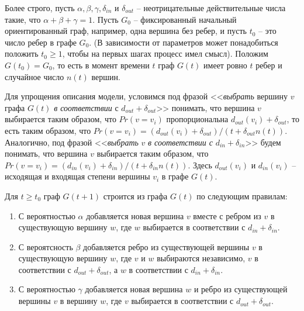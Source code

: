 \documentclass[14pt]{extreport}
\begin{document}
Более строго, пусть $\alpha, \beta, \gamma, \delta_{in}$ и $\delta_{out}$ -- неотрицательные действительные числа такие, что $\alpha + \beta + \gamma = 1$. Пусть $G_0$ -- фиксированный начальный ориентированный граф, например, одна вершина без ребер, и пусть $t_0$ -- это число ребер в графе $G_0$. (В зависимости от параметров может понадобиться положить $t_0 \ge 1$, чтобы на первых шагах процесс имел смысл). Положим $G(t_0) = G_0$, то есть в момент времени $t$ граф $G(t)$ имеет ровно $t$ ребер и случайное число $n(t)$ вершин.

Для упрощения описания модели, условимся под фразой <<{\it выбрать} вершину $v$ графа $G(t)$ {\it в соответствии} с $d_{out} + \delta_{out}$>> понимать, что вершина $v$ выбирается таким образом, что $Pr(v=v_i)$ пропорциональна $d_{out}(v_i) + \delta_{out}$, то есть таким образом, что $Pr(v=v_i)=(d_{out}(v_i) + \delta_{out})/(t  + \delta_{out}n(t))$. Аналогично, под фразой <<{\it выбрать} $v$ {\it в соответствии с} $d_{in} + \delta_{in}$>> будем понимать, что вершина $v$ выбирается таким образом, что $Pr(v=v_i)=(d_{in}(v_i) + \delta_{in})/(t  + \delta_{in}n(t))$. Здесь $d_{out}(v_i)$ и $d_{in}(v_i)$ -- исходящая и входящая степени вершины $v_i$ в графе $G(t)$.

Для $t \ge t_0$ граф $G(t+1)$ строится из графа $G(t)$ по следующим правилам:
\begin{enumerate}
\item С вероятностью $\alpha$ добавляется новая вершина $v$ вместе с ребром из $v$ в существующую вершину $w$, где $w$ выбирается в соответствии с $d_{in} + \delta_{in}$.
\item С вероятсность $\beta$ добавляется ребро из существующей вершины $v$ в существующую вершину $w$, где $v$ и $w$ выбираются независимо, $v$ в соответствии с $d_{out} + \delta_{out}$, а $w$ в соответствии с $d_{in} + \delta_{in}$.
\item С вероятностью $\gamma$ добавляется новая вершина $w$ и ребро из существующей вершины $v$ в вершину $w$, где $v$ выбирается в соответствии с $d_{out} + \delta_{out}$.
\end{enumerate}
\end{document}
